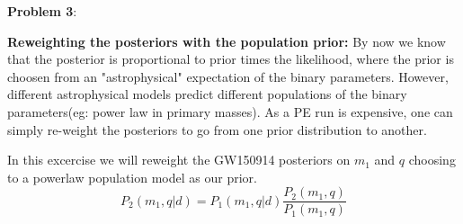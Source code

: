 \documentclass{article} %
\newcommand{\question}[2][]{\begin{flushleft}
        \textbf{Problem #1}: %
\end{flushleft}
}
\begin{document}
    \question[3]{} 
    \textbf{Reweighting the posteriors with the population prior:} By now we know that the posterior is proportional to prior times the likelihood, where the prior is choosen from an "astrophysical" expectation of the binary parameters. However, different astrophysical models predict different populations of the binary parameters(eg: power law in primary masses). As a PE run is expensive, one can simply re-weight the posteriors to go from one prior distribution to another.
   
In this excercise we will reweight the GW150914 posteriors on $m_1$ and $q$  choosing to a powerlaw population model as our prior.
\begin{equation}
 	P_2(m_1,q|d) = P_1(m_1,q|d) \frac{P_2(m_1,q)}{P_1(m_1,q)}
\end{equation}
\end{document}
